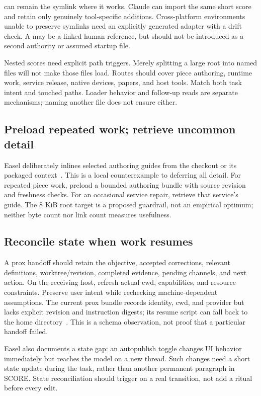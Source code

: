 \documentclass[10pt,letterpaper,twocolumn]{article}
\newcommand{\file}[1]{\texttt{\path{#1}}}
\begin{document}
\file{AGENTS.md} can remain the symlink where it works. Claude can import the same short score and retain only genuinely tool-specific additions. Cross-platform environments unable to preserve symlinks need an explicitly generated adapter with a drift check. A \file{CODEX.md} may be a linked human reference, but should not be introduced as a second authority or assumed startup file.

Nested scores need explicit path triggers. Merely splitting a large root into named files will not make those files load. Routes should cover piece authoring, runtime work, service release, native devices, papers, and host tools. Match both task intent and touched paths. Loader behavior and follow-up reads are separate mechanisms; naming another file does not ensure either.


\subsection{Preload repeated work; retrieve uncommon detail}
Easel deliberately inlines selected authoring guides from the checkout or its packaged context~\cite{bundle}. This is a local counterexample to deferring all detail. For repeated piece work, preload a bounded authoring bundle with source revision and freshness checks. For an occasional service repair, retrieve that service's guide. The 8 KiB root target is a proposed guardrail, not an empirical optimum; neither byte count nor link count measures usefulness.

\subsection{Reconcile state when work resumes}
A prox handoff should retain the objective, accepted corrections, relevant definitions, worktree/revision, completed evidence, pending channels, and next action. On the receiving host, refresh actual cwd, capabilities, and resource constraints. Preserve user intent while rechecking machine-dependent assumptions. The current prox bundle records identity, cwd, and provider but lacks explicit revision and instruction digests; its resume script can fall back to the home directory~\cite{prox}. This is a schema observation, not proof that a particular handoff failed.

Easel also documents a state gap: an autopublish toggle changes UI behavior immediately but reaches the model on a new thread. Such changes need a short state update during the task, rather than another permanent paragraph in SCORE. State reconciliation should trigger on a real transition, not add a ritual before every edit.
\end{document}

